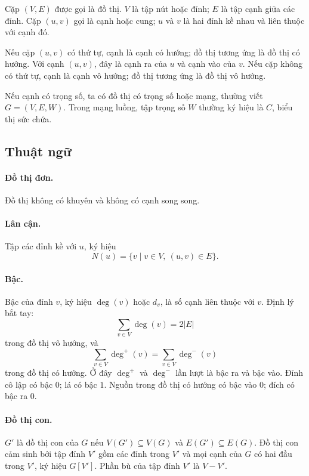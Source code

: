 \documentclass[11pt]{article}
\begin{document}
Cặp \((V,E)\) được gọi là đồ thị. \(V\) là tập nút hoặc đỉnh; \(E\) là tập
cạnh giữa các đỉnh. Cặp \((u,v)\) gọi là cạnh hoặc cung; \(u\) và \(v\) là
hai đỉnh kề nhau và liên thuộc với cạnh đó.

Nếu cặp \((u,v)\) có thứ tự, cạnh là cạnh có hướng; đồ thị tương ứng là đồ
thị có hướng. Với cạnh \((u,v)\), đây là cạnh ra của \(u\) và cạnh vào của
\(v\). Nếu cặp không có thứ tự, cạnh là cạnh vô hướng; đồ thị tương ứng là đồ
thị vô hướng.

Nếu cạnh có trọng số, ta có đồ thị có trọng số hoặc mạng, thường viết
\(G=(V,E,W)\). Trong mạng luồng, tập trọng số \(W\) thường ký hiệu là \(C\),
biểu thị sức chứa.

\subsection{Thuật ngữ}

\paragraph{Đồ thị đơn.}
Đồ thị không có khuyên và không có cạnh song song.

\paragraph{Lân cận.}
Tập các đỉnh kề với \(u\), ký hiệu
\[
  N(u)=\{v\mid v\in V,\ (u,v)\in E\}.
\]

\paragraph{Bậc.}
Bậc của đỉnh \(v\), ký hiệu \(\deg(v)\) hoặc \(d_v\), là số cạnh liên thuộc
với \(v\). Định lý bắt tay:
\[
  \sum_{v\in V}\deg(v)=2|E|
\]
trong đồ thị vô hướng, và
\[
  \sum_{v\in V}\deg^+(v)=\sum_{v\in V}\deg^-(v)
\]
trong đồ thị có hướng. Ở đây \(\deg^+\) và \(\deg^-\) lần lượt là bậc ra và
bậc vào. Đỉnh cô lập có bậc \(0\); lá có bậc \(1\). Nguồn trong đồ thị có
hướng có bậc vào \(0\); đích có bậc ra \(0\).

\paragraph{Đồ thị con.}
\(G'\) là đồ thị con của \(G\) nếu \(V(G')\subseteq V(G)\) và
\(E(G')\subseteq E(G)\). Đồ thị con cảm sinh bởi tập đỉnh \(V'\) gồm các đỉnh
trong \(V'\) và mọi cạnh của \(G\) có hai đầu trong \(V'\), ký hiệu \(G[V']\).
Phần bù của tập đỉnh \(V'\) là \(V-V'\).
\end{document}
